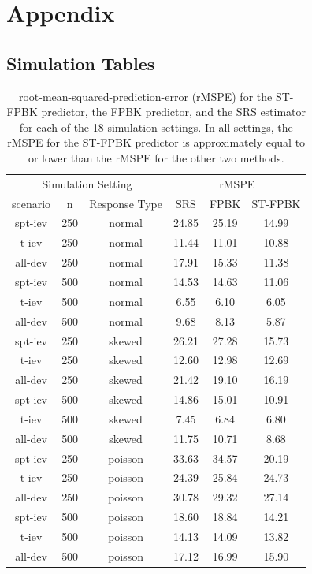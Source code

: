 \documentclass[smallextended]{svjour3}       %
\begin{document}
\setcounter{table}{0}
\setcounter{subsection}{0}
\renewcommand{\thetable}{A\arabic{table}}
\renewcommand{\thesubsection}{A.\arabic{subsection}:}

\hypertarget{appendix}{%
\section*{Appendix}\label{appendix}}

\subsection{Simulation Tables}

\begin{table}[H]

\caption{\label{tab:simrmspetab}root-mean-squared-prediction-error (rMSPE) for the ST-FPBK predictor, the FPBK predictor, and the SRS estimator for each of the 18 simulation settings. In all settings, the rMSPE for the ST-FPBK predictor is approximately equal to or lower than the rMSPE for the other two methods.}
\centering
\begin{tabular}[t]{cccccc}
\toprule
\multicolumn{3}{c}{Simulation Setting} & \multicolumn{3}{c}{rMSPE} \\
\cmidrule(l{3pt}r{3pt}){1-3} \cmidrule(l{3pt}r{3pt}){4-6}
scenario & n & Response Type & SRS & FPBK & ST-FPBK\\
\midrule
spt-iev & 250 & normal & 24.85 & 25.19 & 14.99\\
t-iev & 250 & normal & 11.44 & 11.01 & 10.88\\
all-dev & 250 & normal & 17.91 & 15.33 & 11.38\\
\midrule
spt-iev & 500 & normal & 14.53 & 14.63 & 11.06\\
t-iev & 500 & normal & 6.55 & 6.10 & 6.05\\
all-dev & 500 & normal & 9.68 & 8.13 & 5.87\\
\midrule
spt-iev & 250 & skewed & 26.21 & 27.28 & 15.73\\
t-iev & 250 & skewed & 12.60 & 12.98 & 12.69\\
all-dev & 250 & skewed & 21.42 & 19.10 & 16.19\\
\midrule
spt-iev & 500 & skewed & 14.86 & 15.01 & 10.91\\
t-iev & 500 & skewed & 7.45 & 6.84 & 6.80\\
all-dev & 500 & skewed & 11.75 & 10.71 & 8.68\\
spt-iev & 250 & poisson & 33.63 & 34.57 & 20.19\\
t-iev & 250 & poisson & 24.39 & 25.84 & 24.73\\
all-dev & 250 & poisson & 30.78 & 29.32 & 27.14\\
spt-iev & 500 & poisson & 18.60 & 18.84 & 14.21\\
t-iev & 500 & poisson & 14.13 & 14.09 & 13.82\\
all-dev & 500 & poisson & 17.12 & 16.99 & 15.90\\
\bottomrule
\end{tabular}
\end{table}
\end{document}
